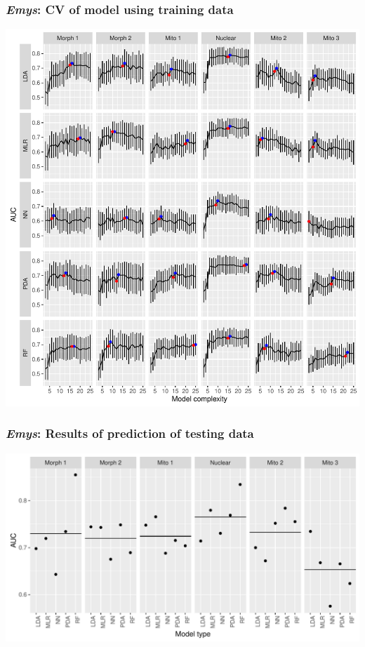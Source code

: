 \documentclass{beamer}
\begin{document}
\begin{frame}
  \frametitle{\textit{Emys}: CV of model using training data}
  \begin{center}
      \includegraphics[width=\textwidth,height=0.8\textheight,keepaspectratio=true]{figure/emys_model_sel}
  \end{center}
\end{frame}

\begin{frame}
  \frametitle{\textit{Emys}: Results of prediction of testing data}
  \begin{center}
    \includegraphics[width=\textwidth,height=0.8\textheight,keepaspectratio=true]{figure/emys_oos_sel}
  \end{center}
\end{frame}
\end{document}

